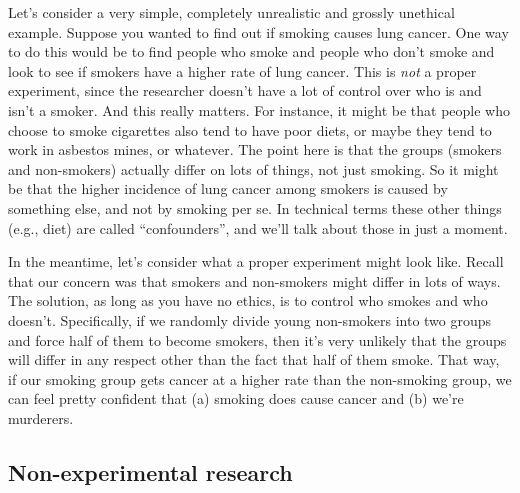 \documentclass[
  a4paper,
]{book}
\begin{document}
Let's consider a very simple, completely unrealistic and grossly
unethical example. Suppose you wanted to find out if smoking causes lung
cancer. One way to do this would be to find people who smoke and people
who don't smoke and look to see if smokers have a higher rate of lung
cancer. This is \emph{not} a proper experiment, since the researcher
doesn't have a lot of control over who is and isn't a smoker. And this
really matters. For instance, it might be that people who choose to
smoke cigarettes also tend to have poor diets, or maybe they tend to
work in asbestos mines, or whatever. The point here is that the groups
(smokers and non-smokers) actually differ on lots of things, not just
smoking. So it might be that the higher incidence of lung cancer among
smokers is caused by something else, and not by smoking per se. In
technical terms these other things (e.g., diet) are called
``confounders'', and we'll talk about those in just a moment.

In the meantime, let's consider what a proper experiment might look
like. Recall that our concern was that smokers and non-smokers might
differ in lots of ways. The solution, as long as you have no ethics, is
to control who smokes and who doesn't. Specifically, if we randomly
divide young non-smokers into two groups and force half of them to
become smokers, then it's very unlikely that the groups will differ in
any respect other than the fact that half of them smoke. That way, if
our smoking group gets cancer at a higher rate than the non-smoking
group, we can feel pretty confident that (a) smoking does cause cancer
and (b) we're murderers.

\hypertarget{non-experimental-research}{%
\subsection{Non-experimental research}\label{non-experimental-research}}
\end{document}
